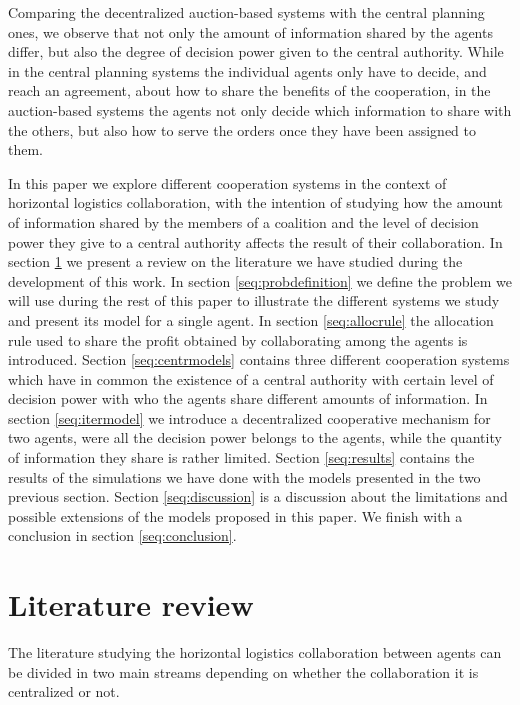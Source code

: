 \documentclass{article}
\begin{document}
Comparing the decentralized auction-based systems with the central planning ones, we observe that not only the amount of information shared by the agents differ, but also the degree of decision power given to the central authority. While in the central planning systems the individual agents only have to decide, and reach an agreement, about how to share the benefits of the cooperation, in the auction-based systems the agents not only decide which information to share with the others, but also how to serve the orders once they have been assigned to them. 

In this paper we explore different cooperation systems in the context of horizontal logistics collaboration, with the intention of studying how the amount of information shared by the members of a coalition and the level of decision power they give to a central authority affects the result of their collaboration. In section \ref{seq:litreview} we present a review on the literature we have studied during the development of this work. In section \ref{seq:probdefinition} we define the problem we will use during the rest of this paper to illustrate the different systems we study and present its model for a single agent. In section \ref{seq:allocrule} the allocation rule used to share the profit obtained by collaborating among the agents is introduced. Section \ref{seq:centrmodels} contains three different cooperation systems which have in common the existence of a central authority with certain level of decision power with who the agents share different amounts of information. In section \ref{seq:itermodel} we introduce a decentralized cooperative mechanism for two agents, were all the decision power belongs to the agents, while the quantity of information they share is rather limited. Section \ref{seq:results} contains the results of the simulations we have done with the models presented in the two previous section. Section \ref{seq:discussion} is a discussion about the limitations and possible extensions of the models proposed in this paper. We finish with a conclusion in section \ref{seq:conclusion}.



\section{Literature review}\label{seq:litreview}

The literature studying the horizontal logistics collaboration between agents
can be divided in two main streams depending on whether the collaboration it is
centralized or not.
\end{document}
